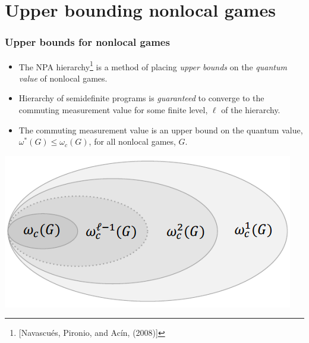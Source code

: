 \documentclass{beamer}
\newcommand{\ip}[2]{\langle #1 , #2\rangle}
\def\H{\mathcal{H}}
\newcommand{\setft}[1]{\mathrm{#1}}
\newcommand{\Density}{\setft{D}}
\newcommand{\Pos}{\setft{Pos}}
\begin{document}
  \section{Upper bounding nonlocal games}

\begin{frame}
	\frametitle{Upper bounds for nonlocal games}
	\begin{itemize}
		\item The NPA hierarchy\footnote{[Navascu\'es, Pironio, and Ac\'in, (2008)]} is a method of placing \emph{upper bounds} on the \emph{quantum value} of nonlocal games. 
		\item Hierarchy of semidefinite programs is \emph{guaranteed} to converge to the commuting measurement value for some finite level, $\ell$ of the hierarchy. 
		\item The commuting measurement value is an upper bound on the quantum value, $\omega^*(G) \leq \omega_c(G)$, for all nonlocal games, $G$. 
	\end{itemize}
	\begin{center}
		\includegraphics[scale=0.5]{figures/CommutingValues}
	\end{center}
\end{frame}

%
\end{document}
